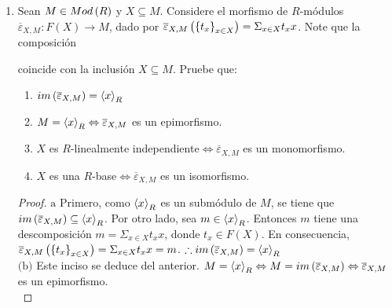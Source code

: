 \documentclass{article}
\begin{document}
\begin{enumerate}[label=\textbf{Ej \arabic*.}]
\begin{proof}
\begin{align*}
				\implies & \restrict{\overline{f}}{X}=f.
			\end{align*}
			Finalmente, sea $g:F\to N$ un morfismo de $R$-módulos tal que $\restrict{g}{X}=f$ y $a\in F$. Se tiene lo siguiente:
			\begin{align*}
				g\lrprth{a}&=g\lrprth{\sum_{x\in X_a}r_x x}\\
				&=\sum_{x\in X_a}r_x g\lrprth{x}\\
				&=\sum_{x\in X_a}r_x f\lrprth{x}\\
				&=\overline{f}(x).\\
				\implies & g=\overline{f}.
			\end{align*}
		\end{proof}
		\item Sean $M \in Mod\left(R\right)$ y $X \subseteq M$. Considere el morfismo de $R$-módulos $\overline{\varepsilon}_{X,M}:F(X) \longrightarrow M$, dado por $\overline{\varepsilon}_{X,M}\left({\left\{{t}_{x}\right\}}_{x\in X}\right)=\displaystyle\Sigma_{x \in X}t_{x}x$. Note que la composición
		coincide con la inclusión $X \subseteq M$. Pruebe que:
		\begin{enumerate}
			\item $im\left(\overline{\varepsilon}_{X,M}\right)=\left< x\right>_{R}$
			\item $M=\left< x\right>_{R}\Leftrightarrow\overline{\varepsilon}_{X,M}$ es un epimorfismo.
			\item $X$ es $R$-linealmente independiente$\Leftrightarrow\overline{\varepsilon}_{X,M}$ es un monomorfismo.
			\item $X$ es una $R$-base$\Leftrightarrow\overline{\varepsilon}_{X,M}$ es un isomorfismo.
		\end{enumerate}
		\begin{proof}
			$\boxed{\text{a}}$ Primero, como $\left< x\right>_{R}$ es un submódulo de $M$, se tiene que $im\left(\overline{\varepsilon}_{X,M}\right)\subseteq\left< x\right>_{R}$. Por otro lado, sea $m\in\left< x\right>_{R}$. Entonces $m$ tiene una descomposición $m=\displaystyle\Sigma_{x \in X}t_{x}x$, donde $t_{x} \in F(X)$. En consecuencia, $\overline{\varepsilon}_{X,M}\left({\left\{{t}_{x}\right\}}_{x\in X}\right)=\displaystyle\Sigma_{x \in X}t_{x}x=m$. $\therefore im\left(\overline{\varepsilon}_{X,M}\right)=\left< x\right>_{R}$\\
			
			$\boxed{\text{(b)}}$ Este inciso se deduce del anterior. $M=\left< x\right>_{R}\Leftrightarrow M=im\left(\overline{\varepsilon}_{X,M}\right)\Leftrightarrow\overline{\varepsilon}_{X,M}$ es un epimorfismo.\\
			

\end{proof}
\end{enumerate}
\end{document}
